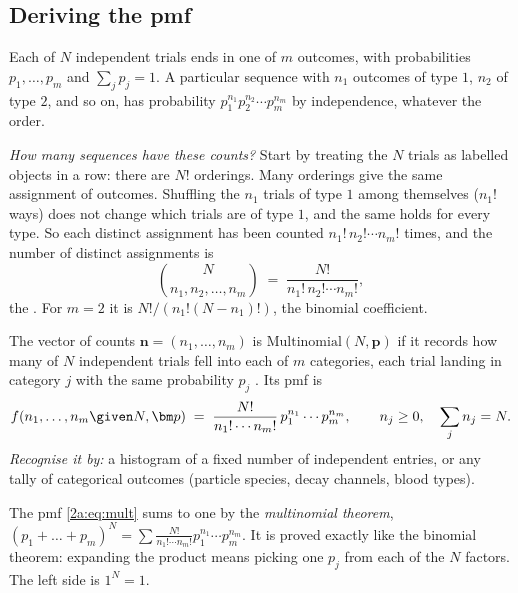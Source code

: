\subsection{Deriving the pmf}

Each of $N$ independent trials ends in one of $m$ outcomes, with probabilities $p_1,\dots,p_m$ and $\sum_jp_j=1$. A particular sequence with $n_1$ outcomes of type $1$, $n_2$ of type $2$, and so on, has probability $p_1^{n_1}p_2^{n_2}\cdots p_m^{n_m}$ by independence, whatever the order.

\emph{How many sequences have these counts?} Start by treating the $N$ trials as labelled objects in a row: there are $N!$ orderings. Many orderings give the same assignment of outcomes. Shuffling the $n_1$ trials of type $1$ among themselves ($n_1!$ ways) does not change which trials are of type $1$, and the same holds for every type. So each distinct assignment has been counted $n_1!\,n_2!\cdots n_m!$ times, and the number of distinct assignments is
\begin{equation}
  \binom{N}{n_1,n_2,\dots,n_m}\;=\;\frac{N!}{n_1!\,n_2!\cdots n_m!}, \label{2a:eq:multcoef}
\end{equation}
the . For $m=2$ it is $N!/(n_1!(N-n_1)!)$, the binomial coefficient.

\begin{workdef}
The vector of counts $\bm n=(n_1,\dots,n_m)$ is $\mathrm{Multinomial}(N,\bm p)$ if it records how many of $N$ independent trials fell into each of $m$ categories, each trial landing in category $j$ with the same probability $p_j$ . Its pmf is
\begin{equation}
  f(n_1,\dots,n_m\given N,\bm p)\;=\;\frac{N!}{n_1!\cdots n_m!}\,p_1^{n_1}\cdots p_m^{n_m},
  \qquad n_j\ge0,\quad \sum_jn_j=N. \label{2a:eq:mult}
\end{equation}
\emph{Recognise it by:} a histogram of a fixed number of independent entries, or any tally of categorical outcomes (particle species, decay channels, blood types).
\end{workdef}

The pmf \eqref{2a:eq:mult} sums to one by the \emph{multinomial theorem}, $(p_1+\dots+p_m)^N=\sum\frac{N!}{n_1!\cdots n_m!}p_1^{n_1}\cdots p_m^{n_m}$. It is proved exactly like the binomial theorem: expanding the product means picking one $p_j$ from each of the $N$ factors. The left side is $1^N=1$.

